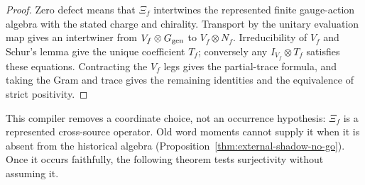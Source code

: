 \documentclass[11pt]{article}
\numberwithin{equation}{section}
\theoremstyle{definition}
\theoremstyle{remark}
\begin{document}
\begin{proof}
Zero defect means that $\Xi_f$ intertwines the represented finite
gauge-action algebra with the stated charge and chirality.  Transport by
the unitary evaluation map gives an intertwiner from
$V_f\otimes G_{\rm gen}$ to $V_f\otimes N_f$.  Irreducibility of $V_f$
and Schur's lemma give the unique coefficient $T_f$; conversely any
$I_{V_f}\otimes T_f$ satisfies these equations.  Contracting the $V_f$ legs
gives the partial-trace formula, and taking the Gram and trace gives the
remaining identities and the equivalence of strict positivity.
\end{proof}

This compiler removes a coordinate choice, not an occurrence hypothesis:
$\Xi_f$ is a represented cross-source operator.  Old word moments cannot
supply it when it is absent from the historical algebra
(Proposition~\ref{thm:external-shadow-no-go}).  Once it occurs faithfully,
the following theorem tests surjectivity without assuming it.
\end{document}
